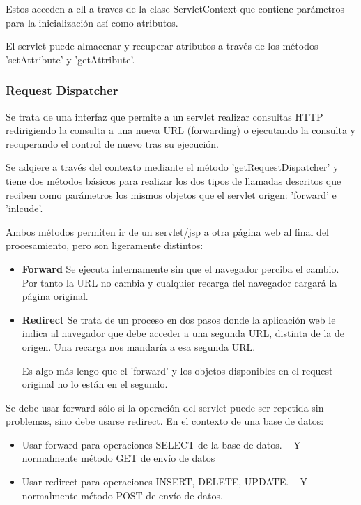 \documentclass{apuntes}
\begin{document}
Estos acceden a ell a traves de la clase ServletContext que contiene parámetros para la inicialización así como atributos.

El servlet puede almacenar y recuperar atributos a través de los métodos 'setAttribute' y 'getAttribute'.

\subsubsection{Request Dispatcher}
Se trata de una interfaz que permite a un servlet realizar consultas HTTP redirigiendo la consulta a una nueva URL (forwarding) o ejecutando la consulta y recuperando el control de nuevo tras su ejecución.

Se adqiere a través del contexto mediante el método 'getRequestDispatcher' y tiene dos métodos básicos para realizar los dos tipos de llamadas descritos que reciben como parámetros los mismos objetos que el servlet origen: 'forward' e 'inlcude'.

Ambos métodos permiten ir de un servlet/jsp a otra página web al final del procesamiento, pero son ligeramente distintos:
\begin{itemize}
\item \textbf{Forward}
Se ejecuta internamente sin que el navegador perciba el cambio. Por tanto la URL no cambia y cualquier recarga del navegador cargará la página original.
\item \textbf{Redirect}
Se trata de un proceso en dos pasos donde la aplicación web le indica al navegador que debe acceder a una segunda URL, distinta de la de origen. Una recarga nos mandaría a esa segunda URL.

Es algo más lengo que el 'forward' y los objetos disponibles en el request original no lo están en el segundo.
\end{itemize}

Se debe usar forward sólo si la operación del servlet puede ser repetida sin problemas, sino debe usarse redirect. En el contexto de una base de datos:
\begin{itemize}
\item Usar forward para operaciones SELECT de la base de datos.
– Y normalmente método GET de envío de datos
\item Usar redirect para operaciones INSERT, DELETE, UPDATE.
– Y normalmente método POST de envío de datos.
\end{itemize}
\end{document}
